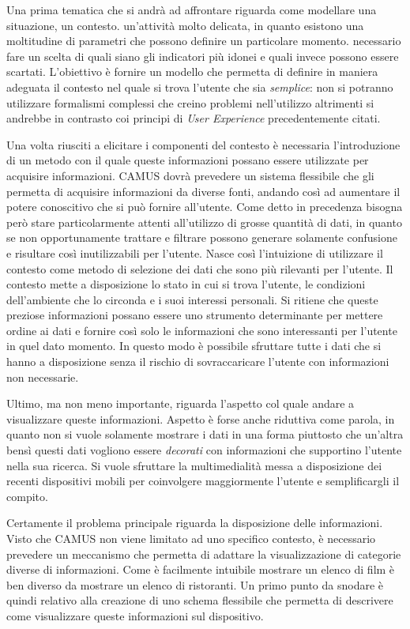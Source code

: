 Una prima tematica che si andrà ad affrontare riguarda come modellare una situazione, un contesto. \upe un'attività molto delicata, in quanto esistono una moltitudine di parametri che possono definire un particolare momento. \upe necessario fare un scelta di quali siano gli indicatori più idonei e quali invece possono essere scartati. L'obiettivo è fornire un modello che permetta di definire in maniera adeguata il contesto nel quale si trova l'utente che sia \emph{semplice}: non si potranno utilizzare formalismi complessi che creino problemi nell'utilizzo altrimenti si andrebbe in contrasto coi principi di \emph{User Experience} precedentemente citati.

Una volta riusciti a elicitare i componenti del contesto è necessaria l'introduzione di un metodo con il quale queste informazioni possano essere utilizzate per acquisire informazioni. CAMUS dovrà prevedere un sistema flessibile che gli permetta di acquisire informazioni da diverse fonti, andando così ad aumentare il potere conoscitivo che si può fornire all'utente. Come detto in precedenza bisogna però stare particolarmente attenti all'utilizzo di grosse quantità di dati, in quanto se non opportunamente trattare e filtrare possono generare solamente confusione e risultare così inutilizzabili per l'utente. Nasce così l'intuizione di utilizzare il contesto come metodo di selezione dei dati che sono più rilevanti per l'utente. Il contesto mette a disposizione lo stato in cui si trova l'utente, le condizioni dell'ambiente che lo circonda e i suoi interessi personali. Si ritiene che queste preziose informazioni possano essere uno strumento determinante per mettere ordine ai dati e fornire così solo le informazioni che sono interessanti per l'utente in quel dato momento. In questo modo è possibile sfruttare tutte i dati che si hanno a disposizione senza il rischio di sovraccaricare l'utente con informazioni non necessarie.

Ultimo, ma non meno importante, riguarda l'aspetto col quale andare a visualizzare queste informazioni. Aspetto è forse anche riduttiva come parola, in quanto non si vuole solamente mostrare i dati in una forma piuttosto che un'altra bensì questi dati vogliono essere \emph{decorati} con informazioni che supportino l'utente nella sua ricerca. Si vuole sfruttare la multimedialità messa a disposizione dei recenti dispositivi mobili per coinvolgere maggiormente l'utente e semplificargli il compito.

Certamente il problema principale riguarda la disposizione delle informazioni. Visto che CAMUS non viene limitato ad uno specifico contesto, è necessario prevedere un meccanismo che permetta di adattare la visualizzazione di categorie diverse di informazioni. Come è facilmente intuibile mostrare un elenco di film è ben diverso da mostrare un elenco di ristoranti. Un primo punto da snodare è quindi relativo alla creazione di uno schema flessibile che permetta di descrivere come visualizzare queste informazioni sul dispositivo.

